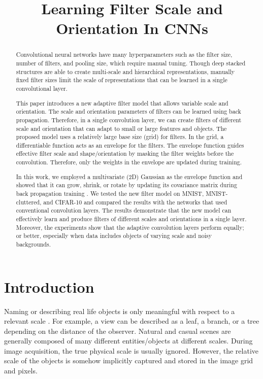 \documentclass{bmvc2k}
\title{Learning Filter Scale and Orientation In CNNs}
\begin{document}
\maketitle

\begin{abstract}
	
Convolutional neural networks have many hyperparameters such as the filter size, number of filters, and pooling size, which require manual tuning. Though deep stacked structures are able to create multi-scale and hierarchical representations, manually fixed filter sizes limit the scale of representations that can be learned in a single convolutional layer. 

This paper introduces a new adaptive filter model that allows variable scale and orientation. The scale and orientation parameters of filters can be learned using back propagation. Therefore, in a single convolution layer, we can create filters of different scale and orientation that can adapt to small or large features and objects. The proposed model uses a relatively large base size (grid) for filters. In the grid, a differentiable function acts as an envelope for the filters. The envelope function guides effective filter scale and shape/orientation by masking the filter weights before the convolution. Therefore, only the weights in the envelope are updated during training.

In this work, we employed a multivariate (2D) Gaussian as the envelope function and showed that it can grow, shrink, or rotate by updating its covariance matrix during back propagation training . We tested the new filter model on MNIST, MNIST-cluttered, and CIFAR-10 and compared the results with the networks that used conventional convolution layers. The results demonstrate that the new model can effectively learn and produce filters of different scales and orientations in a single layer. Moreover, the experiments show that the adaptive convolution layers perform equally; or better, especially when data includes objects of varying scale and noisy backgrounds.

\end{abstract}

\section{Introduction}

Naming or describing real life objects is only meaningful with respect to a relevant scale \cite{Lindeberg:1994:STC:528688}. For example, a view can be described as a leaf, a branch, or a tree depending on the distance of the observer. Natural and casual scenes are generally composed of many different entities/objects at different scales. During image acquisition, the true physical scale is usually ignored. However, the relative scale of the objects is somehow implicitly captured and stored in the image grid and pixels.
\end{document}
